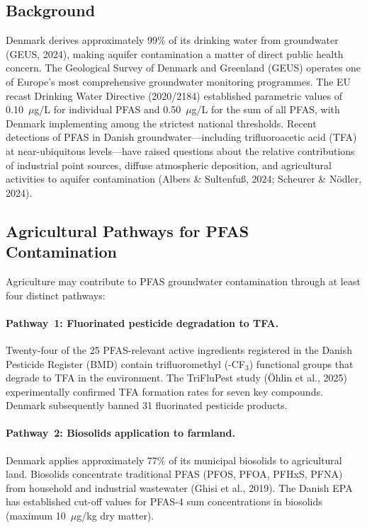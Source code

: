 \documentclass[12pt,a4paper]{article}
\begin{document}
\subsection{Background}

Denmark derives approximately 99\% of its drinking water from groundwater (GEUS, 2024), making aquifer contamination a matter of direct public health concern. The Geological Survey of Denmark and Greenland (GEUS) operates one of Europe's most comprehensive groundwater monitoring programmes. The EU recast Drinking Water Directive (2020/2184) established parametric values of 0.10~$\mu$g/L for individual PFAS and 0.50~$\mu$g/L for the sum of all PFAS, with Denmark implementing among the strictest national thresholds. Recent detections of PFAS in Danish groundwater---including trifluoroacetic acid (TFA) at near-ubiquitous levels---have raised questions about the relative contributions of industrial point sources, diffuse atmospheric deposition, and agricultural activities to aquifer contamination (Albers \& Sultenfu\ss, 2024; Scheurer \& N\"odler, 2024).

\subsection{Agricultural Pathways for PFAS Contamination}

Agriculture may contribute to PFAS groundwater contamination through at least four distinct pathways:

\paragraph{Pathway~1: Fluorinated pesticide degradation to TFA.} Twenty-four of the 25 PFAS-relevant active ingredients registered in the Danish Pesticide Register (BMD) contain trifluoromethyl (-CF$_3$) functional groups that degrade to TFA in the environment. The TriFluPest study (\"Ohlin et al., 2025) experimentally confirmed TFA formation rates for seven key compounds. Denmark subsequently banned 31 fluorinated pesticide products.

\paragraph{Pathway~2: Biosolids application to farmland.} Denmark applies approximately 77\% of its municipal biosolids to agricultural land. Biosolids concentrate traditional PFAS (PFOS, PFOA, PFHxS, PFNA) from household and industrial wastewater (Ghisi et al., 2019). The Danish EPA has established cut-off values for PFAS-4 sum concentrations in biosolids (maximum 10~$\mu$g/kg dry matter).
\end{document}
